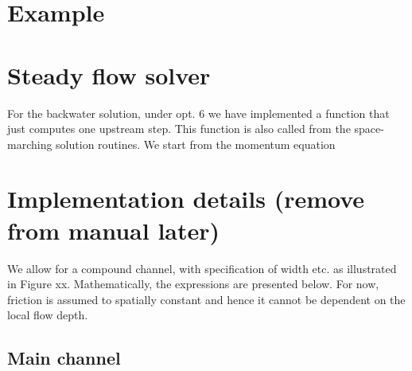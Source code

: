 \documentclass[a4paper, 11pt]{article}
\newcommand{\pa}[2]{\ensuremath{\frac{\partial #1}{\partial #2}}}
\begin{document}
\clearpage
\section{Example}


\clearpage
\appendix 
\section{Steady flow solver}
For the backwater solution, under opt. 6 we have implemented a function that just computes one upstream step. This function is also called from the space-marching solution routines. We start from the momentum equation


\clearpage
\section{Implementation details (remove from manual later)}
We allow for a compound channel, with specification of width etc. as illustrated in Figure xx. Mathematically, the expressions are presented below.
For now, friction is assumed to spatially constant and hence it cannot be dependent on the local flow depth.

\subsection{Main channel}
\end{document}
